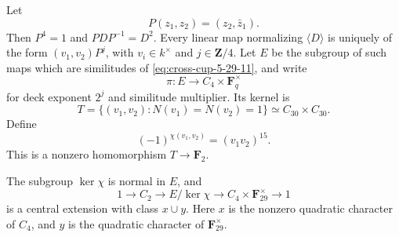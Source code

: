 Let
\[
                    P(z_1,z_2)=(z_2,\bar z_1).
\]
Then \(P^4=1\) and \(PDP^{-1}=D^2\).
Every linear map normalizing \(\langle D\rangle\)
is uniquely of the form \((v_1,v_2)P^j\), with
\(v_i\in k^\times\) and \(j\in\mathbf Z/4\).
Let \(E\) be the subgroup of such maps which are
similitudes of \eqref{eq:cross-cup-5-29-11}, and write
\[
 \pi:E\longrightarrow C_4\times\mathbf F_q^\times
\]
for deck exponent \(2^j\) and similitude multiplier.
Its kernel is
\begin{equation}
 T=\{(v_1,v_2):N(v_1)=N(v_2)=1\}
                   \simeq C_{30}\times C_{30}.             \label{eq:cross-cup-5-29-12}
\end{equation}
Define
\begin{equation}
                 (-1)^{\chi(v_1,v_2)}=(v_1v_2)^{15}.
                                                               \label{eq:cross-cup-5-29-13}
\end{equation}
This is a nonzero homomorphism \(T\to\mathbf F_2\).

\begin{lemma}\label{lem:finite-cross-cup-extension}
The subgroup \(\ker\chi\) is normal in \(E\), and
\begin{equation}
 1\longrightarrow C_2\longrightarrow E/\ker\chi
       \longrightarrow C_4\times\mathbf F_{29}^\times
       \longrightarrow1                                 \label{eq:cross-cup-5-29-14}
\end{equation}
is a central extension with class \(x\cup y\).
Here \(x\) is the nonzero quadratic character of \(C_4\),
and \(y\) is the quadratic character of
\(\mathbf F_{29}^\times\).
\end{lemma}

